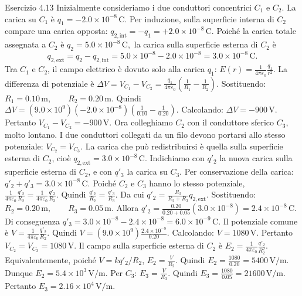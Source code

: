 \documentclass[a4paper]{article}
\begin{document}
\begin{snippetsolution}{Esercizio 4.13}
    Inizialmente consideriamo i due conduttori concentrici \(C_1\) e \(C_2\).
    La carica su \(C_1\) è
    \(q_1 = -2.0 \times 10^{-8}\,\mathrm{C}.\)
    Per induzione, sulla superficie interna di \(C_2\) compare una carica
    opposta:
    \(q_{2,\mathrm{int}} = -q_1 = +2.0 \times 10^{-8}\,\mathrm{C}.\)
    Poiché la carica totale assegnata a \(C_2\) è
    \(q_2 = 5.0 \times 10^{-8}\,\mathrm{C},\)
    la carica sulla superficie esterna di \(C_2\) è
    \[
        q_{2,\mathrm{ext}}
        =
        q_2 - q_{2,\mathrm{int}}
        =
        5.0 \times 10^{-8}
        -
        2.0 \times 10^{-8}
        =
        3.0 \times 10^{-8}\,\mathrm{C}.
    \]
    Tra \(C_1\) e \(C_2\), il campo elettrico è dovuto solo alla carica \(q_1\):
    \(E(r) = \frac{1}{4\pi\varepsilon_0} \frac{q_1}{r^2}.\)
    La differenza di potenziale è
    \(\Delta V = V_{C_1} - V_{C_2} = \frac{q_1}{4\pi\varepsilon_0} \left( \frac{1}{R_1} - \frac{1}{R_2} \right).\)
    Sostituendo:
    \(R_1 = 0.10\,\mathrm{m}, \qquad R_2 = 0.20\,\mathrm{m}.\)
    Quindi
    \(\Delta V = \left(9.0 \times 10^9\right) \left(-2.0 \times 10^{-8}\right) \left( \frac{1}{0.10} - \frac{1}{0.20} \right).\)
    Calcolando:
    \(\Delta V = -900\,\mathrm{V}.\)
    Pertanto
    \(\boxed{V_{C_1} - V_{C_2} = -900\,\mathrm{V}}.\)
    Ora colleghiamo \(C_2\) con il conduttore sferico \(C_3\), molto lontano.
    I due conduttori collegati da un filo devono portarsi allo stesso
    potenziale:
    \(V_{C_2} = V_{C_3}.\)
    La carica che può redistribuirsi è quella sulla superficie esterna di
    \(C_2\), cioè
    \(q_{2,\mathrm{ext}} = 3.0 \times 10^{-8}\,\mathrm{C}.\)
    Indichiamo con \(q'_2\) la nuova carica sulla superficie esterna di \(C_2\),
    e con \(q'_3\) la carica su \(C_3\). Per conservazione della carica:
    \(q'_2 + q'_3 = 3.0 \times 10^{-8}\,\mathrm{C}.\)
    Poiché \(C_2\) e \(C_3\) hanno lo stesso potenziale,
    \(\frac{1}{4\pi\varepsilon_0}\frac{q'_2}{R_2} = \frac{1}{4\pi\varepsilon_0}\frac{q'_3}{R_3}.\)
    Quindi
    \(\frac{q'_2}{R_2} = \frac{q'_3}{R_3}.\)
    Da cui
    \(q'_2 = \frac{R_2}{R_2+R_3} q_{2,\mathrm{ext}}.\)
    Sostituendo:
    \(R_2 = 0.20\,\mathrm{m}, \qquad R_3 = 0.05\,\mathrm{m}.\)
    Allora
    \(q'_2 = \frac{0.20}{0.20+0.05} \left(3.0 \times 10^{-8}\right) = 2.4 \times 10^{-8}\,\mathrm{C}.\)
    Di conseguenza
    \(q'_3 = 3.0 \times 10^{-8} - 2.4 \times 10^{-8} = 6.0 \times 10^{-9}\,\mathrm{C}.\)
    Il potenziale comune è
    \(V = \frac{1}{4\pi\varepsilon_0} \frac{q'_2}{R_2}.\)
    Quindi
    \(V = \left(9.0 \times 10^9\right) \frac{2.4 \times 10^{-8}}{0.20}.\)
    Calcolando:
    \(V = 1080\,\mathrm{V}.\)
    Pertanto
    \(\boxed{V_{C_2} = V_{C_3} = 1080\,\mathrm{V}}.\)
    Il campo sulla superficie esterna di \(C_2\) è
    \(E_2 = \frac{1}{4\pi\varepsilon_0} \frac{q'_2}{R_2^2}.\)
    Equivalentemente, poiché \(V = kq'_2/R_2\),
    \(E_2 = \frac{V}{R_2}.\)
    Quindi
    \(E_2 = \frac{1080}{0.20} = 5400\,\mathrm{V/m}.\)
    Dunque
    \(\boxed{E_2 = 5.4 \times 10^3\,\mathrm{V/m}}.\)
    Per \(C_3\):
    \(E_3 = \frac{V}{R_3}.\)
    Quindi
    \(E_3 = \frac{1080}{0.05} = 21600\,\mathrm{V/m}.\)
    Pertanto
    \(\boxed{E_3 = 2.16 \times 10^4\,\mathrm{V/m}}.\)
\end{snippetsolution}
\pagebreak
\end{document}

